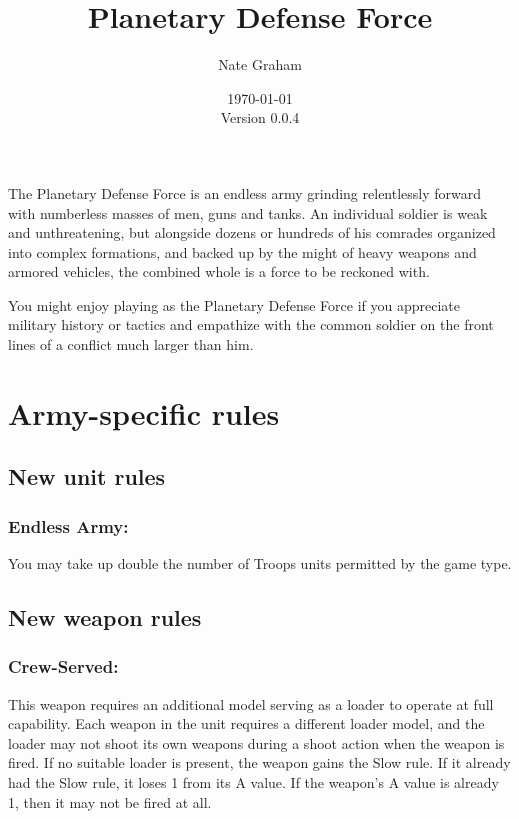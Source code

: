 \documentclass[landscape]{extarticle}
\begin{document}
\title{Planetary Defense Force}
\author{Nate Graham}
\date{\today\\ Version 0.0.4}

\maketitle

The Planetary Defense Force is an endless army grinding relentlessly forward with numberless masses of men, guns and tanks. An individual soldier is weak and unthreatening, but alongside dozens or hundreds of his comrades organized into complex formations, and backed up by the might of heavy weapons and armored vehicles, the combined whole is a force to be reckoned with.

You might enjoy playing as the Planetary Defense Force if you appreciate military history or tactics and empathize with the common soldier on the front lines of a conflict much larger than him.

 

\section*{Army-specific rules}

\subsection*{New unit rules}

\subsubsection*{Endless Army:} You may take up double the number of Troops units permitted by the game type.

\subsection*{New weapon rules}

\subsubsection*{Crew-Served:} This weapon requires an additional model serving as a loader to operate at full capability. Each weapon in the unit requires a different loader model, and the loader may not shoot its own weapons during a shoot action when the weapon is fired. If no suitable loader is present, the weapon gains the Slow rule. If it already had the Slow rule, it loses 1 from its A value. If the weapon's A value is already 1, then it may not be fired at all.
\end{document}
